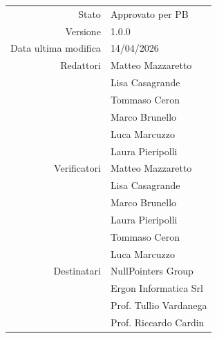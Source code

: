 \begin{center}
\begin{tabular}{r|l}
    Stato & Approvato per PB \\[0.5em]
    Versione & 1.0.0 \\[0.5em]
    Data ultima modifica & 14/04/2026 \\[0.5em]
    Redattori & Matteo Mazzaretto \\
              & Lisa Casagrande \\
              & Tommaso Ceron \\
              & Marco Brunello \\
              & Luca Marcuzzo \\
              & Laura Pieripolli \\ [0.5em]
    Verificatori & Matteo Mazzaretto \\
    			 & Lisa Casagrande \\
    			 & Marco Brunello \\
    			 & Laura Pieripolli \\
    			 & Tommaso Ceron \\
    			 & Luca Marcuzzo \\[0.5em]
    Destinatari & NullPointers Group \\
                & Ergon Informatica Srl \\
                & Prof. Tullio Vardanega \\
                & Prof. Riccardo Cardin \\
\end{tabular}
\end{center}
